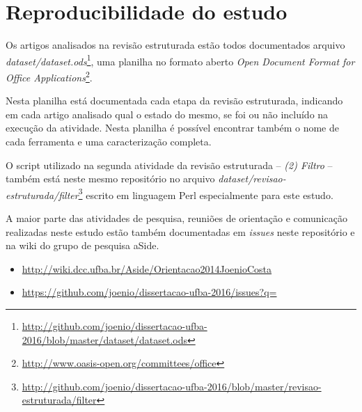 \section{Reproducibilidade do estudo}
\label{reproducibilidade-do-estudo}

Os artigos analisados na revisão estruturada estão todos documentados arquivo
{\it
dataset/dataset.ods}\footnote{\url{http://github.com/joenio/dissertacao-ufba-2016/blob/master/dataset/dataset.ods}},
uma planilha no formato aberto {\it Open Document Format for Office
Applications}\footnote{\url{http://www.oasis-open.org/committees/office}}.

Nesta planilha está documentada cada etapa da revisão estruturada, indicando em
cada artigo analisado qual o estado do mesmo, se foi ou não incluído na
execução da atividade.  Nesta planilha é possível encontrar também o nome de
cada ferramenta e uma caracterização completa.

O script utilizado na segunda atividade da revisão estruturada -- {\it (2)
Filtro} -- também está neste mesmo repositório no arquivo {\it
dataset/revisao-estruturada/filter}\footnote{\url{http://github.com/joenio/dissertacao-ufba-2016/blob/master/revisao-estruturada/filter}}
escrito em linguagem Perl especialmente para este estudo.

A maior parte das atividades de pesquisa, reuniões de orientação e comunicação
realizadas neste estudo estão também documentadas em {\it issues} neste
repositório e na wiki do grupo de pesquisa aSide.

\begin{itemize}
  \item \url{http://wiki.dcc.ufba.br/Aside/Orientacao2014JoenioCosta}
  \item \url{https://github.com/joenio/dissertacao-ufba-2016/issues?q=}
\end{itemize}
